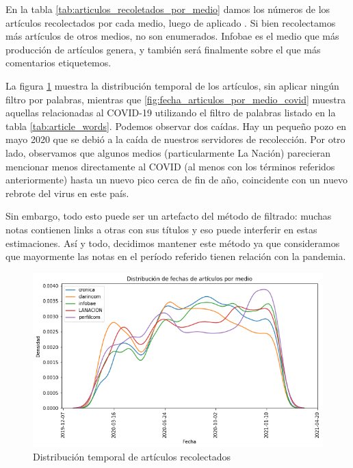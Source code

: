 En la tabla \ref{tab:articulos_recoletados_por_medio} damos los números de los artículos recolectados por cada medio, luego de aplicado . Si bien recolectamos más artículos de otros medios, no son enumerados. Infobae es el medio que más producción de artículos genera, y también será finalmente sobre el que más comentarios etiquetemos.

La figura \ref{fig:fecha_articulos_por_medio_todas} muestra la distribución temporal de los artículos, sin aplicar ningún filtro por palabras, mientras que \ref{fig:fecha_articulos_por_medio_covid} muestra aquellas relacionadas al COVID-19 utilizando el filtro de palabras listado en la tabla \ref{tab:article_words}. Podemos observar dos caídas. Hay un pequeño pozo en mayo 2020 que se debió a la caída de nuestros servidores de recolección. Por otro lado, observamos que algunos medios (particularmente La Nación) parecieran mencionar menos directamente al COVID (al menos con los términos referidos anteriormente) hasta un nuevo pico cerca de fin de año, coincidente con un nuevo rebrote del virus en este país.

Sin embargo, todo esto puede ser un artefacto del método de filtrado: muchas notas contienen links a otras con sus títulos y eso puede interferir en estas estimaciones. Así y todo, decidimos mantener este método ya que consideramos que mayormente las notas en el período referido tienen relación con la pandemia.

\begin{figure}
    \centering
    \includegraphics[width=\textwidth]{img/fechas_por_medios_todas.png}
    \caption{Distribución temporal de artículos recolectados}
    \label{fig:fecha_articulos_por_medio_todas}
\end{figure}



